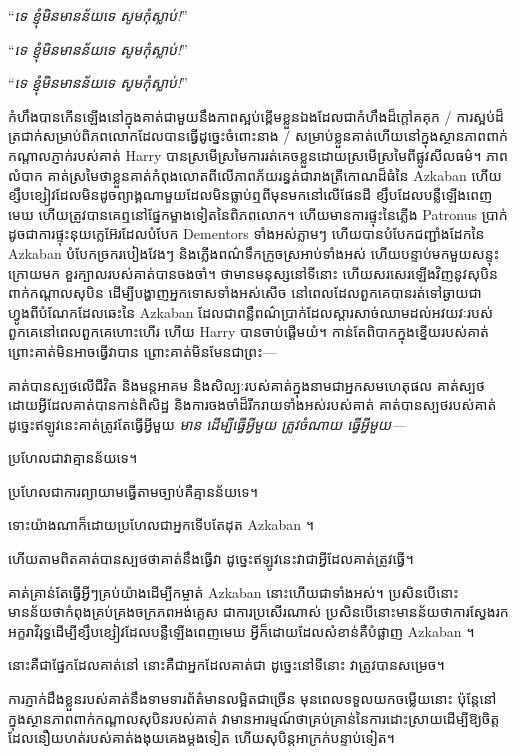 {{{{{{{{{{{{{“\emph{ទេ ខ្ញុំមិនមានន័យទេ សូមកុំស្លាប់!}”

“\emph{ទេ ខ្ញុំមិនមានន័យទេ សូមកុំស្លាប់!}”

“\emph{ទេ ខ្ញុំមិនមានន័យទេ សូមកុំស្លាប់!}”

កំហឹងបានកើនឡើងនៅក្នុងគាត់ជាមួយនឹងភាពស្អប់ខ្ពើមខ្លួនឯងដែលជាកំហឹងដ៏ក្តៅគគុក / ការស្អប់ដ៏ត្រជាក់សម្រាប់ពិភពលោកដែលបានធ្វើដូច្នេះចំពោះនាង / សម្រាប់ខ្លួនគាត់ហើយនៅក្នុងស្ថានភាពពាក់កណ្តាលភ្ញាក់របស់គាត់ Harry បានស្រមើស្រមៃការរត់គេចខ្លួនដោយស្រមើស្រមៃពីផ្លូវសីលធម៌។ ភាពលំបាក គាត់ស្រមៃថាខ្លួនគាត់កំពុងលោតពីលើភាពភ័យរន្ធត់ជារាងត្រីកោណដ៏ធំនៃ Azkaban ហើយខ្សឹបខ្សៀវដែលមិនដូចព្យាង្គណាមួយដែលមិនធ្លាប់ឮពីមុនមកនៅលើផែនដី ខ្សឹបដែលបន្លឺឡើងពេញមេឃ ហើយត្រូវបានគេឮនៅផ្នែកម្ខាងទៀតនៃពិភពលោក។ ហើយមានការផ្ទុះនៃភ្លើង Patronus ប្រាក់ដូចជាការផ្ទុះនុយក្លេអ៊ែរដែលបំបែក Dementors ទាំងអស់ភ្លាមៗ ហើយបានបំបែកជញ្ជាំងដែកនៃ Azkaban បំបែកច្រករបៀងវែងៗ និងភ្លើងពណ៌ទឹកក្រូចស្រអាប់ទាំងអស់ ហើយបន្ទាប់មកមួយសន្ទុះក្រោយមក ខួរក្បាលរបស់គាត់បានចងចាំ។ ថាមានមនុស្សនៅទីនោះ ហើយសរសេរឡើងវិញនូវសុបិនពាក់កណ្តាលសុបិន ដើម្បីបង្ហាញអ្នកទោសទាំងអស់សើច នៅពេលដែលពួកគេបានរត់ទៅឆ្ងាយជាហ្វូងពីបំណែកដែលឆេះនៃ Azkaban ដែលជាពន្លឺពណ៌ប្រាក់ដែលស្តារសាច់ឈាមដល់អវយវៈរបស់ពួកគេនៅពេលពួកគេហោះហើរ ហើយ Harry បានចាប់ផ្តើមយំ។ កាន់​តែ​ពិបាក​ក្នុង​ខ្នើយ​របស់​គាត់ ព្រោះ​គាត់​មិន​អាច​ធ្វើ​វា​បាន ព្រោះ​គាត់​មិន​មែន​ជា​ព្រះ—

គាត់បានស្បថលើជីវិត និងមន្តអាគម និងសិល្បៈរបស់គាត់ក្នុងនាមជាអ្នកសមហេតុផល គាត់ស្បថដោយអ្វីដែលគាត់បានកាន់ពិសិដ្ឋ និងការចងចាំដ៏រីករាយទាំងអស់របស់គាត់ គាត់បានស្បថរបស់គាត់ ដូច្នេះឥឡូវនេះគាត់ត្រូវតែធ្វើអ្វីមួយ \emph{មាន ដើម្បីធ្វើអ្វីមួយ ត្រូវចំណាយ \emph{ធ្វើអ្វីមួយ—}}

ប្រហែលជាវាគ្មានន័យទេ។

ប្រហែលជាការព្យាយាមធ្វើតាមច្បាប់គឺគ្មានន័យទេ។

ទោះយ៉ាងណាក៏ដោយប្រហែលជាអ្នកទើបតែដុត Azkaban ។

ហើយតាមពិតគាត់បានស្បថថាគាត់នឹងធ្វើវា ដូច្នេះឥឡូវនេះវាជាអ្វីដែលគាត់ត្រូវធ្វើ។

គាត់គ្រាន់តែធ្វើអ្វីៗគ្រប់យ៉ាងដើម្បីកម្ចាត់ Azkaban នោះហើយជាទាំងអស់។ ប្រសិនបើនោះមានន័យថាកំពុងគ្រប់គ្រងចក្រភពអង់គ្លេស ជាការប្រសើរណាស់ ប្រសិនបើនោះមានន័យថាការស្វែងរកអក្ខរាវិរុទ្ធដើម្បីខ្សឹបខ្សៀវដែលបន្លឺឡើងពេញមេឃ អ្វីក៏ដោយដែលសំខាន់គឺបំផ្លាញ Azkaban ។

នោះគឺជាផ្នែកដែលគាត់នៅ នោះគឺជាអ្នកដែលគាត់ជា ដូច្នេះនៅទីនោះ វាត្រូវបានសម្រេច។

ការភ្ញាក់ដឹងខ្លួនរបស់គាត់នឹងទាមទារព័ត៌មានលម្អិតជាច្រើន មុនពេលទទួលយកចម្លើយនោះ ប៉ុន្តែនៅក្នុងស្ថានភាពពាក់កណ្តាលសុបិនរបស់គាត់ វាមានអារម្មណ៍ថាគ្រប់គ្រាន់នៃការដោះស្រាយដើម្បីឱ្យចិត្តដែលនឿយហត់របស់គាត់ងងុយគេងម្តងទៀត ហើយសុបិន្តអាក្រក់បន្ទាប់ទៀត។

}}}}}}}}}}}}}

